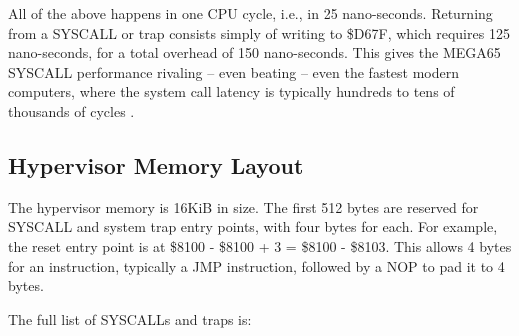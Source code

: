All of the above happens in one CPU cycle, i.e., in 25 nano-seconds.
Returning from a SYSCALL or trap consists simply of writing to \$D67F, which
requires 125 nano-seconds, for a total overhead of 150 nano-seconds.
This gives the MEGA65 SYSCALL performance rivaling -- even beating
-- even the fastest modern computers, where the system call latency is
typically hundreds to tens of thousands of cycles \cite{soares2010flexsc}.

\subsection{Hypervisor Memory Layout}

The hypervisor memory is 16KiB in size.  The first 512 bytes are
reserved for SYSCALL and system trap entry
points, with four bytes for each.  For example, the reset entry point is
at \$8100 - \$8100 + 3 = \$8100 - \$8103.
This allows 4 bytes for an instruction, typically a JMP instruction,
followed by a NOP to pad it to 4 bytes.

The full list of SYSCALLs and traps is:


